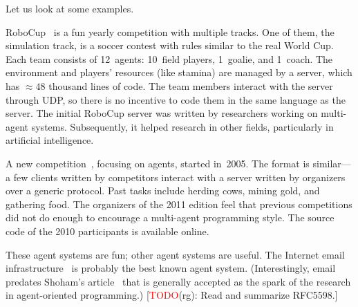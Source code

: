 \documentclass{article}
\newcommand{\rg}[1]{{\small[\textcolor{red}{TODO}(rg): #1]}}
\begin{document}
Let us look at some examples.

RoboCup~\cite{journals/robotics/KitanoANM1998,site/robocup} is a fun yearly competition with multiple tracks.
One of them, the simulation track, is a soccer contest with rules similar to the real World Cup.
Each team consists of 12~agents: 10~field players, 1~goalie, and 1~coach.
The environment and players' resources (like stamina) are managed by a server, which has $\approx48$ thousand lines of code.
The team members interact with the server through UDP, so there is no incentive to code them in the same language as the server.
The initial RoboCup server was written by researchers working on multi-agent systems.
Subsequently, it helped research in other fields, particularly in artificial intelligence.

A new competition~\cite{site/mas_contest}, focusing on agents, started in~2005.
The format is similar---a few clients written by competitors interact with a server written by organizers over a generic protocol.
Past tasks include herding cows, mining gold, and gathering food.
The organizers of the 2011 edition feel that previous competitions did not do enough to encourage a multi-agent programming style.
The source code of the 2010 participants is available online.

These agent systems are fun; other agent systems are useful.
The Internet email infrastructure~\cite{rfc/5598} is probably the best known agent system.
(Interestingly, email predates Shoham's article~\cite{journals/ai/Shoham93} that is generally accepted as the spark of the research in agent-oriented programming.)
\rg{Read and summarize RFC5598.}
\end{document}
